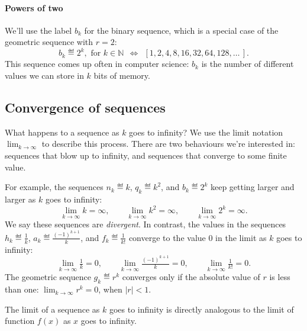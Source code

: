 		\paragraph{Powers of two}

			We'll use the label $b_k$
			for the binary sequence,
			which is a special case of the geometric sequence with $r=2$:
			\[
				b_k \eqdef 2^k, \text{ for } k \in \mathbb{N}
				  \ \ \Leftrightarrow \ \ 
				  [ 1, 2, 4, 8, 16, 32, 64, 128, \ldots \, ].
			\]
			This sequence comes up often in computer science:
			$b_k$ is the number of different values we can store in $k$ bits of memory.


\vspace{-4mm}	%

	\subsection{Convergence of sequences}
	\label{sequences_and_series:convergence_of_sequences}

\vspace{-3mm}	%

		What happens to a sequence as $k$ goes to infinity?
		We use the limit notation $\lim_{k \to \infty}$ to describe this process.
		There are two behaviours we're interested in:
		sequences that blow up to infinity,
		and sequences that converge to some finite value. %

		For example,
		the sequences $n_k \eqdef k$, $q_k \eqdef k^2$, and $b_k \eqdef 2^k$
		keep getting larger and larger as $k$ goes to infinity:
		\[
			\lim_{k \to \infty} k = \infty,
			\qquad
			\lim_{k \to \infty} k^2 = \infty,
			\qquad
			\lim_{k \to \infty} 2^k = \infty.
		\]
		We say these sequences are \emph{divergent}.
		In contrast,
		the values in the sequences $h_k \eqdef \tfrac{1}{k}$,
		$a_k \eqdef \tfrac{(-1)^{k+1}}{k}$,
		and $f_k \eqdef \tfrac{1}{k!}$
		converge to the value $0$ in the limit as $k$ goes to infinity:
		\[
			\lim_{k \to \infty} \tfrac{1}{k} = 0,
			\qquad
			\lim_{k \to \infty} \tfrac{(-1)^{k+1}}{k} = 0,
			\qquad
			\lim_{k \to \infty} \tfrac{1}{k!} =  0.
		\]
		The geometric sequence $g_k \eqdef r^k$
		converges only if the absolute value of $r$ is less than one:
		$\lim_{k \to \infty} r^k = 0$, when $|r| < 1$.

		The limit of a sequence as $k$ goes to infinity
		is directly analogous to the limit of function $f(x)$ as $x$ goes to infinity.



